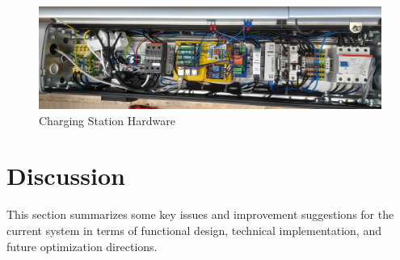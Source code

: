 \documentclass[
	english,
	ruledheaders=section,%
	class=report,%
	thesis={type=Report},%
	accentcolor=9c,%
	custommargins=true,%
	marginpar=false,%
	parskip=half-,%
	fontsize=11pt,%
	logofile={img/tuda_logo.pdf}, %
]{tudapub}
\begin{document}
\begin{enumerate}
    \begin{figure}[H]
        \centering
        \includegraphics[width=0.8\linewidth]{img/ChargeStationHardware.jpg}
        \caption{Charging Station Hardware}
        \label{fig:Charging_station_hardware}
    \end{figure}
    
\end{enumerate}

\section{Discussion}
\label{sec: discussion}
This section summarizes some key issues and improvement suggestions for the current system in terms of functional design, technical implementation, and future optimization directions.
\end{document}
